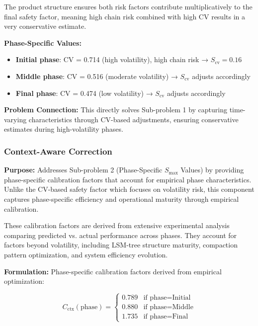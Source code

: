 \documentclass[11pt]{article}
\begin{document}
The product structure ensures both risk factors contribute multiplicatively to the final safety factor, meaning high chain risk combined with high CV results in a very conservative estimate.

\textbf{Phase-Specific Values:}
\begin{itemize}
    \item \textbf{Initial phase}: CV = 0.714 (high volatility), high chain risk → $S_{\text{cv}} = 0.16$
    \item \textbf{Middle phase}: CV = 0.516 (moderate volatility) → $S_{\text{cv}}$ adjusts accordingly
    \item \textbf{Final phase}: CV = 0.474 (low volatility) → $S_{\text{cv}}$ adjusts accordingly
\end{itemize}

\textbf{Problem Connection:} This directly solves Sub-problem 1 by capturing time-varying characteristics through CV-based adjustments, ensuring conservative estimates during high-volatility phases.

\subsubsection{Context-Aware Correction}
\textbf{Purpose:} Addresses Sub-problem 2 (Phase-Specific $S_{\max}$ Values) by providing phase-specific calibration factors that account for empirical phase characteristics. Unlike the CV-based safety factor which focuses on volatility risk, this component captures phase-specific efficiency and operational maturity through empirical calibration.

These calibration factors are derived from extensive experimental analysis comparing predicted vs. actual performance across phases. They account for factors beyond volatility, including LSM-tree structure maturity, compaction pattern optimization, and system efficiency evolution.

\textbf{Formulation:} Phase-specific calibration factors derived from empirical optimization:

\begin{equation}
C_{\text{ctx}}(\text{phase}) = \begin{cases}
0.789 & \text{if phase} = \text{Initial} \\
0.880 & \text{if phase} = \text{Middle} \\
1.735 & \text{if phase} = \text{Final}
\end{cases}
\end{equation}
\end{document}
